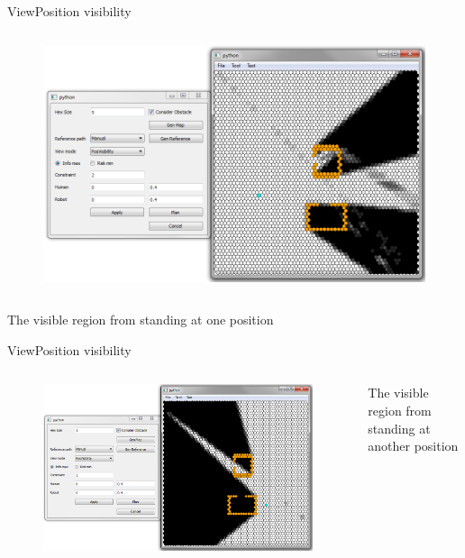 \begin{frame}{View}{Position visibility}

\begin{columns}
\begin{figure}
\centering
\includegraphics[width = \textwidth]{./screenshot/position_visibility_view1.png}
\end{figure}

\begin{minipage}{\textwidth}
\end{minipage}
\end{columns}
The visible region from standing at one position 
\end{frame}

\begin{frame}{View}{Position visibility}

\begin{columns}
\begin{figure}
\centering
\includegraphics[width = \textwidth]{./screenshot/position_visibility_view2.png}
\end{figure}

\begin{minipage}{\textwidth}
The visible region from standing at another position 
\end{minipage}
\end{columns}

\end{frame}

